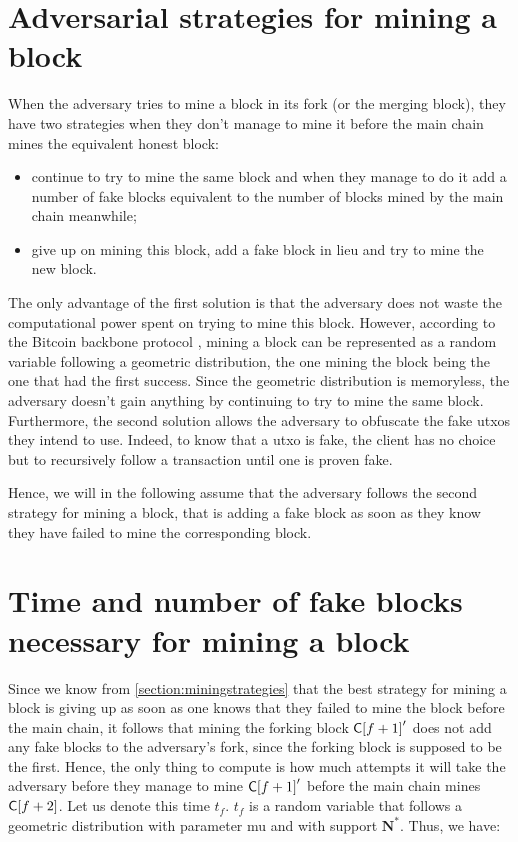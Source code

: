 \section{Adversarial strategies for mining a block}
\label{section:miningstrategies}
    When the adversary tries to mine a block in its fork (or the merging block), they have two strategies when they don't manage to mine it before the main chain mines the equivalent honest block:
    \begin{itemize}
        \item continue to try to mine the same block and when they manage to do it add a number of fake blocks equivalent to the number of blocks mined by the main chain meanwhile;
        \item give up on mining this block, add a fake block in lieu and try to mine the new block.
    \end{itemize}
    The only advantage of the first solution is that the adversary does not waste the computational power spent on trying to mine this block. However, according to the Bitcoin backbone protocol \cite{Backbone}, mining a block can be represented as a random variable following a geometric distribution, the one mining the block being the one that had the first success. Since the geometric distribution is memoryless, the adversary doesn't gain anything by continuing to try to mine the same block. Furthermore, the second solution allows the adversary to obfuscate the fake \glspl{utxo} they intend to use. Indeed, to know that a \gls{utxo} is fake, the client has no choice but to recursively follow a transaction until one is proven fake.
    
    Hence, we will in the following assume that the adversary follows the second strategy for mining a block, that is adding a fake block as soon as they know they have failed to mine the corresponding block.

\section{Time and number of fake blocks necessary for mining a block}
\label{section:blockmined}

Since we know from \autoref{section:miningstrategies} that the best strategy for mining a block is giving up as soon as one knows that they failed to mine the block before the main chain, it follows that mining the forking block \(\mathsf{C[}f+1\mathsf{]}'\) does not add any fake blocks to the adversary's fork, since the forking block is supposed to be the first. Hence, the only thing to compute is how much attempts it will take the adversary before they manage to mine \(\mathsf{C[}f+1\mathsf{]}'\) before the main chain mines \(\mathsf{C[}f+2\mathsf{]}\). Let us denote this time \(t_f\). \(t_f\) is a random variable that follows a geometric distribution with parameter \gls{mu} and with support \(\mathbf{N}^*\). Thus, we have:


